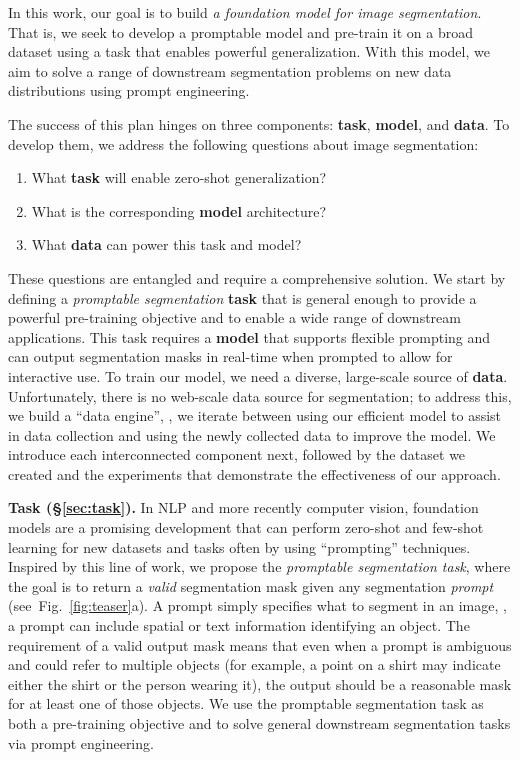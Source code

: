\documentclass[10pt,twocolumn,letterpaper]{article}
\renewcommand{\paragraph}[1]{\vspace{1.25mm}\noindent\textbf{#1}}
\newcommand{\fig}[1]{Fig.~\ref{#1}}
\begin{document}
In this work, our goal is to build \emph{a foundation model for image segmentation}. That is, we seek to develop a promptable model and pre-train it on a broad dataset using a task that enables powerful generalization. With this model, we aim to solve a range of downstream segmentation problems on new data distributions using prompt engineering.

The success of this plan hinges on three components: \textbf{task}, \textbf{model}, and \textbf{data}. To develop them, we address the following questions about image segmentation:
\begin{enumerate}[itemsep=-0.6mm]
\item What \textbf{task} will enable zero-shot generalization?
\item What is the corresponding \textbf{model} architecture?
\item What \textbf{data} can power this task and model?
\end{enumerate}
These questions are entangled and require a comprehensive solution. We start by defining a \emph{promptable segmentation} \textbf{task} that is general enough to provide a powerful pre-training objective and to enable a wide range of downstream applications. This task requires a \textbf{model} that supports flexible prompting and can output segmentation masks in real-time when prompted to allow for interactive use. To train our model, we need a diverse, large-scale source of \textbf{data}. Unfortunately, there is no web-scale data source for segmentation; to address this, we build a ``data engine'', \ie, we iterate between using our efficient model to assist in data collection and using the newly collected data to improve the model. We introduce each interconnected component next, followed by the dataset we created and the experiments that demonstrate the effectiveness of our approach.

\paragraph{Task (\S\ref{sec:task}).} In NLP and more recently computer vision, foundation models are a promising development that can perform zero-shot and few-shot learning for new datasets and tasks often by using ``prompting'' techniques. Inspired by this line of work, we propose the \emph{promptable segmentation task}, where the goal is to return a \emph{valid} segmentation mask given any segmentation \emph{prompt} (see~\fig{fig:teaser}{\color{linkcolor}a}). A prompt simply specifies what to segment in an image, \eg, a prompt can include spatial or text information identifying an object. The requirement of a valid output mask means that even when a prompt is ambiguous and could refer to multiple objects (for example, a point on a shirt may indicate either the shirt or the person wearing it), the output should be a reasonable mask for at least one of those objects. We use the promptable segmentation task as both a pre-training objective and to solve general downstream segmentation tasks via prompt engineering.
\end{document}
